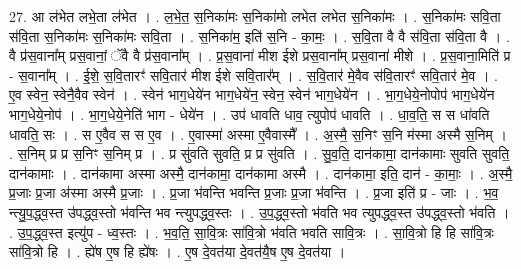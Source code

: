 \documentclass[17pt]{extarticle}
\begin{document}
27. आ ल॑भेत लभे॒ता ल॑भेत । . ल॒भे॒त॒ स॒निका॑मः स॒निका॑मो लभेत लभेत स॒निका॑मः । . स॒निका॑मः सवि॒ता स॑वि॒ता स॒निका॑मः स॒निका॑मः सवि॒ता । . स॒निका॑म॒ इति॑ स॒नि - का॒मः॒ । . स॒वि॒ता वै वै स॑वि॒ता स॑वि॒ता वै । . वै प्र॑स॒वाना᳚म् प्रस॒वानां॒ ॅवै वै प्र॑स॒वाना᳚म् । . प्र॒स॒वाना॑ मीश ईशे प्रस॒वाना᳚म् प्रस॒वाना॑ मीशे । . प्र॒स॒वाना॒मिति॑ प्र - स॒वाना᳚म् । . ई॒शे॒ स॒वि॒तारꣳ॑ सवि॒तार॑ मीश ईशे सवि॒तार᳚म् । . स॒वि॒तार॑ मे॒वैव स॑वि॒तारꣳ॑ सवि॒तार॑ मे॒व । . ए॒व स्वेन॒ स्वेनै॒वैव स्वेन॑ । . स्वेन॑ भाग॒धेये॑न भाग॒धेये॑न॒ स्वेन॒ स्वेन॑ भाग॒धेये॑न । . भा॒ग॒धेये॒नोपोप॑ भाग॒धेये॑न भाग॒धेये॒नोप॑ । . भा॒ग॒धेये॒नेति॑ भाग - धेये॑न । . उप॑ धावति धाव॒ त्युपोप॑ धावति । . धा॒व॒ति॒ स स धा॑वति धावति॒ सः । . स ए॒वैव स स ए॒व । . ए॒वास्मा॑ अस्मा ए॒वैवास्मै᳚ । . अ॒स्मै॒ स॒निꣳ स॒नि म॑स्मा अस्मै स॒निम् । . स॒निम् प्र प्र स॒निꣳ स॒निम् प्र । . प्र सु॑वति सुवति॒ प्र प्र सु॑वति । . सु॒व॒ति॒ दान॑कामा॒ दान॑कामाः सुवति सुवति॒ दान॑कामाः । . दान॑कामा अस्मा अस्मै॒ दान॑कामा॒ दान॑कामा अस्मै । . दान॑कामा॒ इति॒ दान॑ - का॒माः॒ । . अ॒स्मै॒ प्र॒जाः प्र॒जा अ॑स्मा अस्मै प्र॒जाः । . प्र॒जा भ॑वन्ति भवन्ति प्र॒जाः प्र॒जा भ॑वन्ति । . प्र॒जा इति॑ प्र - जाः । . भ॒व॒ न्त्यु॒प॒द्ध्व॒स्त उ॑पद्ध्व॒स्तो भ॑वन्ति भव न्त्युपद्ध्व॒स्तः । . उ॒प॒द्ध्व॒स्तो भ॑वति भव त्युपद्ध्व॒स्त उ॑पद्ध्व॒स्तो भ॑वति । . उ॒प॒द्ध्व॒स्त इत्यु॑प - ध्व॒स्तः । . भ॒व॒ति॒ सा॒वि॒त्रः सा॑वि॒त्रो भ॑वति भवति सावि॒त्रः । . सा॒वि॒त्रो हि हि सा॑वि॒त्रः सा॑वि॒त्रो हि । . ह्ये॑ष ए॒ष हि ह्ये॑षः । . ए॒ष दे॒वत॑या दे॒वत॑यै॒ष ए॒ष दे॒वत॑या । \newline
\end{document}
